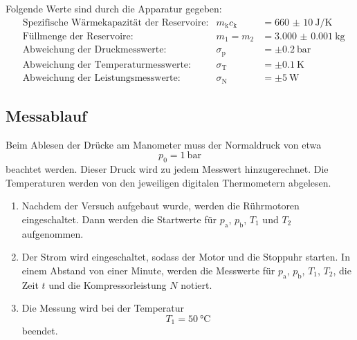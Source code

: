 Folgende Werte sind durch die Apparatur gegeben:
\begin{align}
  & \text{Spezifische Wärmekapazität der Reservoire:} & m_\text{k}c_\text{k} & =\SI{660(10)}
  {\joule\per\kelvin} \\
  & \text{Füllmenge der Reservoire:} & m_1 = m_2 & = \SI{3.000(1)}{\kilo\gram} \\
  & \text{Abweichung der Druckmesswerte:} & \sigma_\text{p} & =\pm \SI{0.2}
  {\bar} \\
  & \text{Abweichung der Temperaturmesswerte:} & \sigma_\text{T} & =\pm
  \SI{0.1}{\kelvin} \\
  & \text{Abweichung der Leistungsmesswerte:} & \sigma_\text{N} & =\pm \SI{5}
  {\watt}
\end{align}

\subsection{Messablauf}

Beim Ablesen der Drücke am Manometer muss der Normaldruck von etwa
\begin{equation}
  p_0 = \SI{1}{\bar}
\end{equation}
beachtet werden. Dieser Druck wird zu jedem Messwert hinzugerechnet.
Die Temperaturen werden von den jeweiligen digitalen Thermometern abgelesen.

\begin{enumerate}

\item Nachdem der Versuch aufgebaut wurde, werden die Rührmotoren eingeschaltet.
Dann werden die Startwerte für $p_\text{a}$, $p_\text{b}$, $T_1$ und $T_2$
aufgenommen.

\item Der Strom wird eingeschaltet, sodass der Motor und die Stoppuhr starten.
In einem Abstand von einer Minute, werden die Messwerte für $p_\text{a}$,
$p_\text{b}$, $T_1$, $T_2$, die Zeit $t$ und die Kompressorleistung $N$ notiert.

\item Die Messung wird bei der Temperatur
\begin{equation}
  T_1 = \SI{50}{\celsius}
\end{equation}
beendet.

\end{enumerate}
